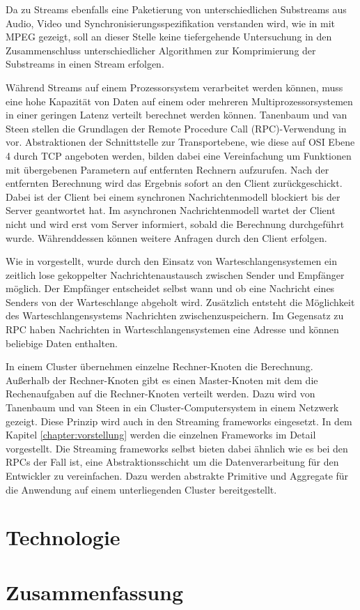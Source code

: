 Da zu Streams ebenfalls eine Paketierung von unterschiedlichen Substreams aus Audio, Video und Synchronisierungsspezifikation verstanden wird, wie in  mit MPEG gezeigt, soll an dieser Stelle keine tiefergehende Untersuchung in den Zusammenschluss unterschiedlicher Algorithmen zur Komprimierung der Substreams in einen Stream erfolgen. 


Während Streams auf einem Prozessorsystem verarbeitet werden können, muss eine hohe Kapazität von Daten auf einem oder mehreren Multiprozessorsystemen in einer geringen Latenz verteilt berechnet werden können. Tanenbaum und van Steen stellen die Grundlagen der Remote Procedure Call (RPC)-Verwendung in  vor. Abstraktionen der Schnittstelle zur Transportebene, wie diese auf OSI Ebene 4 durch TCP angeboten werden, bilden dabei eine Vereinfachung um Funktionen mit übergebenen Parametern auf entfernten Rechnern aufzurufen. Nach der entfernten Berechnung wird das Ergebnis sofort an den Client zurückgeschickt. Dabei ist der Client bei einem synchronen Nachrichtenmodell blockiert bis der Server geantwortet hat. Im asynchronen Nachrichtenmodell wartet der Client nicht und wird erst vom Server informiert, sobald die Berechnung durchgeführt wurde. Währenddessen können weitere Anfragen durch den Client erfolgen. 

Wie in  vorgestellt, wurde durch den Einsatz von Warteschlangensystemen ein zeitlich lose gekoppelter Nachrichtenaustausch zwischen Sender und Empfänger möglich. Der Empfänger entscheidet selbst wann und ob eine Nachricht eines Senders von der Warteschlange abgeholt wird. Zusätzlich entsteht die Möglichkeit des Warteschlangensystems Nachrichten zwischenzuspeichern. Im Gegensatz zu RPC haben Nachrichten in Warteschlangensystemen eine Adresse und können beliebige Daten enthalten. 

In einem Cluster übernehmen einzelne Rechner-Knoten die Berechnung. Außerhalb der Rechner-Knoten gibt es einen Master-Knoten mit dem die Rechenaufgaben auf die Rechner-Knoten verteilt werden. Dazu wird von Tanenbaum und van Steen in  ein Cluster-Computersystem in einem Netzwerk gezeigt. Diese Prinzip wird auch in den Streaming frameworks eingesetzt. In dem Kapitel \ref{chapter:vorstellung} werden die einzelnen Frameworks im Detail vorgestellt. Die Streaming frameworks selbst bieten dabei ähnlich wie es bei den RPCs der Fall ist, eine Abstraktionsschicht um die Datenverarbeitung für den Entwickler zu vereinfachen. Dazu werden abstrakte Primitive und Aggregate für die Anwendung auf einem unterliegenden Cluster bereitgestellt.

\section{Technologie}
\label{subchapter:technologie}


\section{Zusammenfassung}
